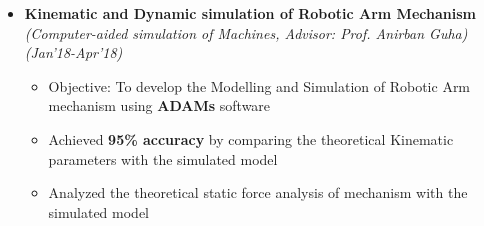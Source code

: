 \documentclass[a4paper,10pt]{article}
\begin{document}
\begin{itemize}
\item \textbf{Kinematic and Dynamic simulation of Robotic Arm Mechanism} \\
\emph{(Computer-aided simulation of Machines, Advisor: Prof. Anirban Guha)\hfill (Jan’18-Apr'18)} \\[-0.4cm]
	\begin{itemize}[noitemsep,nolistsep]
    \item Objective: To develop the Modelling and Simulation of Robotic Arm mechanism using \textbf{ADAMs} software
    \item Achieved \textbf{95\% accuracy} by comparing the theoretical Kinematic parameters with the simulated model 
    \item Analyzed the theoretical static force analysis of mechanism with the simulated model
	\end{itemize}

\end{itemize}
\end{document}
